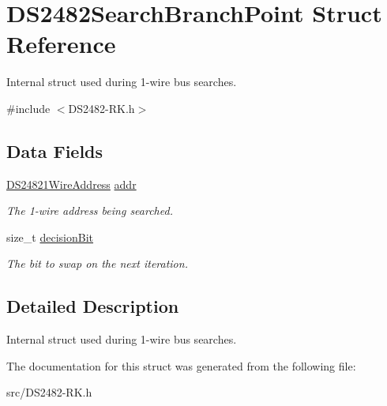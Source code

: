 \hypertarget{struct_d_s2482_search_branch_point}{}\section{D\+S2482\+Search\+Branch\+Point Struct Reference}
\label{struct_d_s2482_search_branch_point}


Internal struct used during 1-\/wire bus searches.  




{\ttfamily \#include $<$D\+S2482-\/\+R\+K.\+h$>$}

\subsection*{Data Fields}
\begin{DoxyCompactItemize}
\item 
\mbox{\label{struct_d_s2482_search_branch_point_a7038aafda9f63172a1253bfc4268cd9a}} 
\mbox{\hyperlink{class_d_s24821_wire_address}{D\+S24821\+Wire\+Address}} \mbox{\hyperlink{struct_d_s2482_search_branch_point_a7038aafda9f63172a1253bfc4268cd9a}{addr}}
\begin{DoxyCompactList}\small\item\em The 1-\/wire address being searched. \end{DoxyCompactList}\item 
\mbox{\label{struct_d_s2482_search_branch_point_a4c6b51a1a55d90aa1619a52153331752}} 
size\+\_\+t \mbox{\hyperlink{struct_d_s2482_search_branch_point_a4c6b51a1a55d90aa1619a52153331752}{decision\+Bit}}
\begin{DoxyCompactList}\small\item\em The bit to swap on the next iteration. \end{DoxyCompactList}\end{DoxyCompactItemize}


\subsection{Detailed Description}
Internal struct used during 1-\/wire bus searches. 

The documentation for this struct was generated from the following file\+:\begin{DoxyCompactItemize}
\item 
src/D\+S2482-\/\+R\+K.\+h\end{DoxyCompactItemize}
